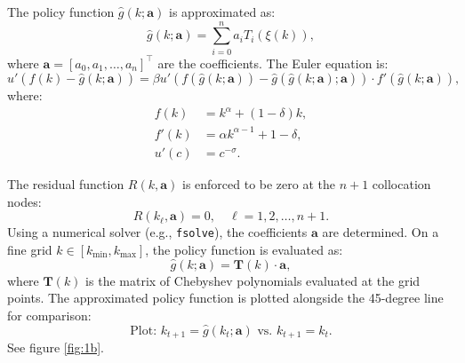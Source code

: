 \documentclass[12pt]{article}
\begin{document}
The policy function $\hat{g}(k; \mathbf{a})$ is approximated as:
\[
\hat{g}(k; \mathbf{a}) = \sum_{i=0}^{n} a_i T_i(\xi(k)),
\]
where $\mathbf{a} = [a_0, a_1, \dots, a_n]^\top$ are the coefficients.
The Euler equation is:
\[
u'(f(k) - \hat{g}(k; \mathbf{a})) = \beta u'(f(\hat{g}(k; \mathbf{a})) - \hat{g}(\hat{g}(k; \mathbf{a}); \mathbf{a})) \cdot f'(\hat{g}(k; \mathbf{a})),
\]
where:
\begin{align*}
f(k) &= k^\alpha + (1 - \delta)k, \\
f'(k) &= \alpha k^{\alpha - 1} + 1 - \delta, \\
u'(c) &= c^{-\sigma}.
\end{align*}

The residual function $R(k, \mathbf{a})$ is enforced to be zero at the $n+1$ collocation nodes:
\[
R(k_\ell, \mathbf{a}) = 0, \quad \ell = 1, 2, \dots, n+1.
\]
Using a numerical solver (e.g., \texttt{fsolve}), the coefficients $\mathbf{a}$ are determined.
On a fine grid $k \in [k_{\min}, k_{\max}]$, the policy function is evaluated as:
\[
\hat{g}(k; \mathbf{a}) = \mathbf{T}(k) \cdot \mathbf{a},
\]
where $\mathbf{T}(k)$ is the matrix of Chebyshev polynomials evaluated at the grid points.
The approximated policy function is plotted alongside the 45-degree line for comparison:
\[
\text{Plot: } k_{t+1} = \hat{g}(k_t; \mathbf{a}) \text{ vs. } k_{t+1} = k_t.
\]
See figure \eqref{fig:1b}.
\end{document}
